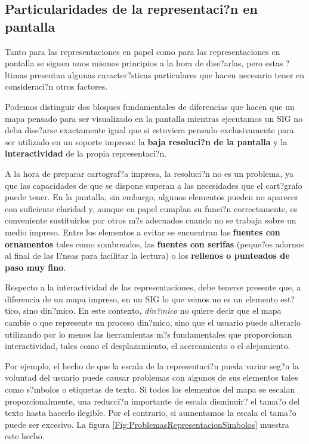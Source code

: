\subsection{Particularidades de la representaci?n en pantalla}

Tanto para las representaciones en papel como para las representaciones en pantalla se siguen unos mismos principios a la hora de dise?arlas, pero estas ?ltimas presentan algunas caracter?sticas particulares que hacen necesario tener en consideraci?n otros factores. 

Podemos distinguir dos bloques fundamentales de diferencias que hacen que un mapa pensado para ser visualizado en la pantalla mientras ejecutamos un SIG no deba dise?arse exactamente igual que si estuviera pensado exclusivamente para ser utilizado en un soporte impreso: la \textbf{baja resoluci?n de la pantalla} y la \textbf{interactividad} de la propia representaci?n.


A la hora de preparar cartograf?a impresa, la resoluci?n no es un problema, ya que las capacidades de que se dispone superan a las necesidades que el cart?grafo puede tener. En la pantalla, sin embargo, algunos elementos pueden no aparecer con suficiente claridad y, aunque en papel cumplan su funci?n correctamente, es conveniente sustituirlos por otros m?s adecuados cuando no se trabaja sobre un medio impreso. Entre los elementos a evitar se encuentran las \textbf{fuentes con ornamentos} tales como sombreados, las \textbf{fuentes con serifas} (peque?os adornos al final de las l?neas para facilitar la lectura) o los \textbf{rellenos o punteados de paso muy fino}.

Respecto a la interactividad de las representaciones, debe tenerse presente que, a diferencia de un mapa impreso, en un SIG lo que vemos no es un elemento est?tico, sino din?mico. En este contexto, \emph{din?mico} no quiere decir que el mapa cambie o que represente un proceso din?mico, sino que el usuario puede alterarlo utilizando por lo menos las herramientas m?s fundamentales que proporcionan interactividad, tales como el desplazamiento, el acercamiento o el alejamiento. 

Por ejemplo, el hecho de que la escala de la representaci?n pueda variar seg?n la voluntad del usuario puede causar problemas con algunos de sus elementos  tales como s?mbolos o etiquetas de texto. Si todos los elementos del mapa se escalan proporcionalmente, una reducci?n importante de escala disminuir? el tama?o del texto hasta hacerlo ilegible. Por el contrario, si aumentamos la escala el tama?o puede ser excesivo. La figura \ref{Fig:ProblemasRepresentacionSimbolos} muestra este hecho. 


